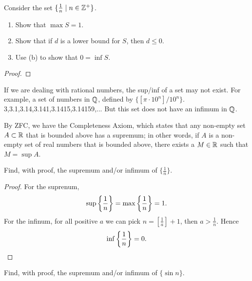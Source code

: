 \begin{prbm}
Consider the set $\{\frac{1}{n} \mid n\in\mathbb Z^{+}\}$.
\begin{enumerate}[label=(\alph*)]
\item Show that $\max S = 1$.
\item Show that if $d$ is a lower bound for $S$, then $d \le 0$.
\item Use (b) to show that $0 = \inf S$.
\end{enumerate}
\end{prbm}

\begin{proof}

\end{proof}

If we are dealing with rational numbers, the sup/inf of a set may not exist. For example, a set of numbers in $\mathbb Q$, defined by $\{[\pi\cdot10^n]/10^n\}$.
3,3.1,3.14,3.141,3.1415,3.14159,...
But this set does not have an infimum in $\mathbb Q$.

By ZFC, we have the Completeness Axiom, which states that any non-empty set $A \subset \mathbb R$ that is bounded above has a supremum; in other words, if $A$ is a non-empty set of real numbers that is bounded above, there exists a $M \in \mathbb R$ such that $M = \sup A$.




\begin{prbm}
Find, with proof, the supremum and/or infimum of $\{\frac{1}{n}\}$.
\end{prbm}

\begin{proof}
For the suprenum,
\[ \sup\left\{\frac{1}{n}\right\} = \max\left\{\frac{1}{n}\right\} = 1. \]
For the infinum, for all positive $a$ we can pick $n=[\frac{1}{a}]+1$, then $a>\frac{1}{n}$. Hence 
\[ \inf\left\{\frac{1}{n}\right\}=0. \]
\end{proof}

\begin{prbm}
Find, with proof, the supremum and/or infimum of $\{\sin n\}$.
\end{prbm}


